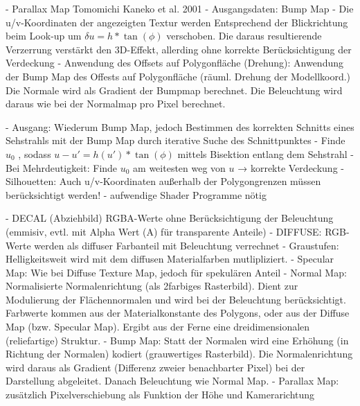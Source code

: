 \documentclass[10pt,landscape]{article}
\begin{document}
\begin{multicols}{3}
- Parallax Map Tomomichi Kaneko et al. 2001
- Ausgangsdaten: Bump Map
- Die u/v-Koordinaten der angezeigten Textur werden Entsprechend der Blickrichtung beim Look-up um $\delta u = h * \tan(\phi)$ verschoben. Die daraus resultierende Verzerrung verstärkt den 3D-Effekt, allerding ohne korrekte Berücksichtigung der Verdeckung
- Anwendung des Offsets auf Polygonfläche (Drehung): Anwendung der Bump Map des Offests auf Polygonfläche (räuml. Drehung der Modellkoord.) Die Normale wird als Gradient der Bumpmap berechnet. Die Beleuchtung wird daraus wie bei der Normalmap pro Pixel berechnet.

- Ausgang: Wiederum Bump Map, jedoch Bestimmen des korrekten Schnitts eines Sehstrahls mit der Bump Map durch iterative Suche des Schnittpunktes
- Finde $u_0$ , sodass $u-u' = h(u') * \tan(\phi)$ mittels Bisektion entlang dem Sehstrahl
- Bei Mehrdeutigkeit: Finde $u_0$ am weitesten weg von $u$ → korrekte Verdeckung
- Silhouetten: Auch u/v-Koordinaten außerhalb der Polygongrenzen müssen berücksichtigt werden!
  - aufwendige Shader Programme nötig

- DECAL (Abziehbild) RGBA-Werte ohne Berücksichtigung der Beleuchtung (emmisiv, evtl. mit Alpha Wert (A) für transparente Anteile)
- DIFFUSE: RGB-Werte werden als diffuser Farbanteil mit Beleuchtung verrechnet
- Graustufen: Helligkeitsweit wird mit dem diffusen Materialfarben mutlipliziert.
- Specular Map: Wie bei Diffuse Texture Map, jedoch für spekulären Anteil
- Normal Map: Normalisierte Normalenrichtung (als 2farbiges Rasterbild). Dient zur Modulierung der Flächennormalen und wird bei der Beleuchtung berücksichtigt. Farbwerte kommen aus der Materialkonstante des Polygons, oder aus der Diffuse Map (bzw. Specular Map). Ergibt aus der Ferne eine dreidimensionalen (reliefartige) Struktur.
- Bump Map: Statt der Normalen wird eine Erhöhung (in Richtung der Normalen) kodiert (grauwertiges Rasterbild). Die Normalenrichtung wird daraus als Gradient (Differenz zweier benachbarter Pixel) bei der Darstellung abgeleitet. Danach Beleuchtung wie Normal Map.
- Parallax Map: zusätzlich Pixelverschiebung als Funktion der Höhe und Kamerarichtung


\end{multicols}
\end{document}
